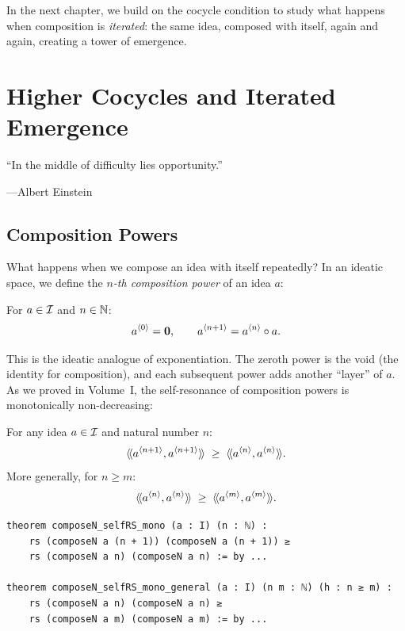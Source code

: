 In the next chapter, we build on the cocycle condition to study what happens when
composition is \emph{iterated}: the same idea, composed with itself, again and
again, creating a tower of emergence.



\chapter{Higher Cocycles and Iterated Emergence}
\label{ch:iterated}

\epigraph{``In the middle of difficulty lies opportunity.''}
{---Albert Einstein}


\section{Composition Powers}

What happens when we compose an idea with itself repeatedly? In an ideatic space,
we define the \emph{$n$-th composition power} of an idea $a$:

\begin{definition}
\label{def:composeN}
For $a \in \mathcal{I}$ and $n \in \mathbb{N}$:
\[
  a^{\langle 0 \rangle} = \mathbf{0}, \qquad a^{\langle n+1 \rangle} = a^{\langle n \rangle} \circ a.
\]
\end{definition}

This is the ideatic analogue of exponentiation. The zeroth power is the void
(the identity for composition), and each subsequent power adds another ``layer''
of $a$. As we proved in Volume~I, the self-resonance of composition powers is
monotonically non-decreasing:

\begin{theorem}
\label{thm:composeN-mono}
For any idea $a \in \mathcal{I}$ and natural number $n$:
\[
  \langle\!\langle a^{\langle n+1 \rangle}, a^{\langle n+1 \rangle} \rangle\!\rangle \;\geq\; \langle\!\langle a^{\langle n \rangle}, a^{\langle n \rangle} \rangle\!\rangle.
\]
More generally, for $n \geq m$:
\[
  \langle\!\langle a^{\langle n \rangle}, a^{\langle n \rangle} \rangle\!\rangle \;\geq\; \langle\!\langle a^{\langle m \rangle}, a^{\langle m \rangle} \rangle\!\rangle.
\]
\end{theorem}

\begin{lstlisting}[caption={Composition power monotonicity (IDT\_v3\_Emergence.lean)}]
theorem composeN_selfRS_mono (a : I) (n : ℕ) :
    rs (composeN a (n + 1)) (composeN a (n + 1)) ≥
    rs (composeN a n) (composeN a n) := by ...

theorem composeN_selfRS_mono_general (a : I) (n m : ℕ) (h : n ≥ m) :
    rs (composeN a n) (composeN a n) ≥
    rs (composeN a m) (composeN a m) := by ...
\end{lstlisting}

